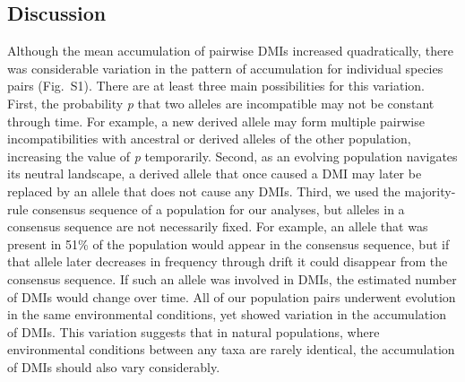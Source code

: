 \begin{doublespace}
\section{Discussion}



Although the mean accumulation of pairwise DMIs increased quadratically,
there was considerable variation in the pattern of accumulation
for individual species pairs (Fig.~S1).
%
There are at least three main possibilities for this variation.
%
First, the probability \emph{p} that two alleles are incompatible
may not be constant through time.
%
For example, a new derived allele may form multiple pairwise incompatibilities
with ancestral or derived alleles of the other population,
increasing the value of \emph{p} temporarily.
%
Second, as an evolving population navigates its neutral landscape,
a derived allele that once caused a DMI may later be replaced
by an allele that does not cause any DMIs.
%
Third, we used the majority-rule consensus sequence
of a population for our analyses,
but alleles in a consensus sequence are not necessarily fixed.
%
For example, an allele that was present in 51\% of the population
would appear in the consensus sequence,
but if that allele later decreases in frequency through drift
it could disappear from the consensus sequence.
%
If such an allele was involved in DMIs,
the estimated number of DMIs would change over time.
%
All of our population pairs underwent evolution
in the same environmental conditions,
yet showed variation in the accumulation of DMIs.
%
This variation suggests that in natural populations,
where environmental conditions between any taxa are rarely identical,
the accumulation of DMIs should also vary considerably.



\end{doublespace}
